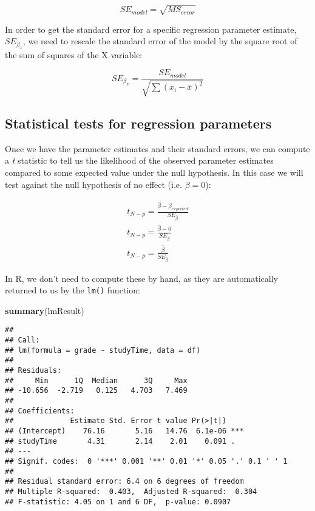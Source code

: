 \documentclass[]{book}
\newenvironment{Shaded}{\begin{snugshade}}{\end{snugshade}}
\newcommand{\KeywordTok}[1]{\textcolor[rgb]{0.13,0.29,0.53}{\textbf{#1}}}
\newcommand{\NormalTok}[1]{#1}
\theoremstyle{definition}
\theoremstyle{definition}
\theoremstyle{definition}
\theoremstyle{remark}
\begin{document}
\[
SE_{model} = \sqrt{MS_{error}}
\]

In order to get the standard error for a specific regression parameter
estimate, \(SE_{\beta_x}\), we need to rescale the standard error of the
model by the square root of the sum of squares of the X variable:

\[
SE_{\beta_x} = \frac{SE_{model}}{\sqrt{{\sum{(x_i - \bar{x})^2}}}}
\]

\subsection{Statistical tests for regression
parameters}\label{statistical-tests-for-regression-parameters}

Once we have the parameter estimates and their standard errors, we can
compute a \emph{t} statistic to tell us the likelihood of the observed
parameter estimates compared to some expected value under the null
hypothesis. In this case we will test against the null hypothesis of no
effect (i.e. \(\beta=0\)):

\[
\begin{array}{c}
t_{N - p} = \frac{\hat{\beta} - \beta_{expected}}{SE_{\hat{\beta}}}\\
t_{N - p} = \frac{\hat{\beta} - 0}{SE_{\hat{\beta}}}\\
t_{N - p} = \frac{\hat{\beta} }{SE_{\hat{\beta}}}
\end{array}
\]

In R, we don't need to compute these by hand, as they are automatically
returned to us by the \texttt{lm()} function:

\begin{Shaded}
\begin{Highlighting}[]
\KeywordTok{summary}\NormalTok{(lmResult)}
\end{Highlighting}
\end{Shaded}

\begin{verbatim}
## 
## Call:
## lm(formula = grade ~ studyTime, data = df)
## 
## Residuals:
##     Min      1Q  Median      3Q     Max 
## -10.656  -2.719   0.125   4.703   7.469 
## 
## Coefficients:
##             Estimate Std. Error t value Pr(>|t|)    
## (Intercept)    76.16       5.16   14.76  6.1e-06 ***
## studyTime       4.31       2.14    2.01    0.091 .  
## ---
## Signif. codes:  0 '***' 0.001 '**' 0.01 '*' 0.05 '.' 0.1 ' ' 1
## 
## Residual standard error: 6.4 on 6 degrees of freedom
## Multiple R-squared:  0.403,  Adjusted R-squared:  0.304 
## F-statistic: 4.05 on 1 and 6 DF,  p-value: 0.0907
\end{verbatim}
\end{document}
